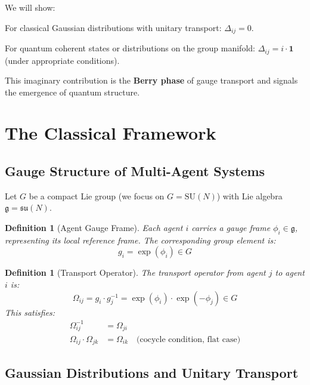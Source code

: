 \documentclass[11pt,a4paper]{article}
\newtheorem{definition}[theorem]{Definition}
\newcommand{\suN}{\mathfrak{su}(N)}
\newcommand{\SUN}{\mathrm{SU}(N)}
\newcommand{\id}{\mathbf{1}}
\begin{document}
We will show:
\begin{keyresult}
For classical Gaussian distributions with unitary transport: $\Delta_{ij} = 0$.

For quantum coherent states or distributions on the group manifold: $\Delta_{ij} = i \cdot \id$ (under appropriate conditions).

This imaginary contribution is the \textbf{Berry phase} of gauge transport and signals the emergence of quantum structure.
\end{keyresult}

\section{The Classical Framework}

\subsection{Gauge Structure of Multi-Agent Systems}

Let $G$ be a compact Lie group (we focus on $G = \SUN$) with Lie algebra $\mathfrak{g} = \suN$.

\begin{definition}[Agent Gauge Frame]
Each agent $i$ carries a gauge frame $\phi_i \in \mathfrak{g}$, representing its local reference frame. The corresponding group element is:
\begin{equation}
    g_i = \exp(\phi_i) \in G
\end{equation}
\end{definition}

\begin{definition}[Transport Operator]
The transport operator from agent $j$ to agent $i$ is:
\begin{equation}
    \Omega_{ij} = g_i \cdot g_j^{-1} = \exp(\phi_i) \cdot \exp(-\phi_j) \in G
\end{equation}
This satisfies:
\begin{align}
    \Omega_{ij}^{-1} &= \Omega_{ji} \\
    \Omega_{ij} \cdot \Omega_{jk} &= \Omega_{ik} \quad \text{(cocycle condition, flat case)}
\end{align}
\end{definition}

\subsection{Gaussian Distributions and Unitary Transport}
\end{document}
